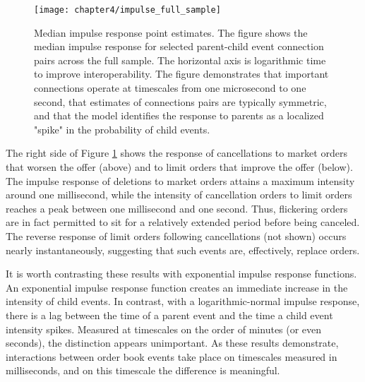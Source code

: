 		\begin{figure}[p]
			\small
			\linespread{1}
			\centering
			\texttt{[image: chapter4/impulse\_full\_sample]}
			\captionsetup{skip=-20pt, position=below, font=footnotesize, justification=justified, width=\linewidth}
			\caption[Median impulse response point estimates]{Median impulse response point estimates. The figure shows the median impulse response for selected parent-child event connection pairs across the full sample. The horizontal axis is logarithmic time to improve interoperability. The figure demonstrates that important connections operate at timescales from one microsecond to one second, that estimates of connections pairs are typically symmetric, and that the model identifies the response to parents as a localized "spike" in the probability of child events.}
			\label{fig:impulse_full_sample}
		\end{figure}

		The right side of Figure \ref{fig:impulse_full_sample} shows the response of cancellations to market orders that worsen the offer (above) and to limit orders that improve the offer (below). The impulse response of deletions to market orders attains a maximum intensity around one millisecond, while the intensity of cancellation orders to limit orders reaches a peak between one millisecond and one second. Thus, flickering orders are in fact permitted to sit for a relatively extended period before being canceled. The reverse response of limit orders following cancellations (not shown) occurs nearly instantaneously, suggesting that such events are, effectively, replace orders.

		It is worth contrasting these results with exponential impulse response functions. An exponential impulse response function creates an immediate increase in the intensity of child events. In contrast, with a logarithmic-normal impulse response, there is a lag between the time of a parent event and the time a child event intensity spikes. Measured at timescales on the order of minutes (or even seconds), the distinction appears unimportant. As these results demonstrate, interactions between order book events take place on timescales measured in milliseconds, and on this timescale the difference is meaningful.


